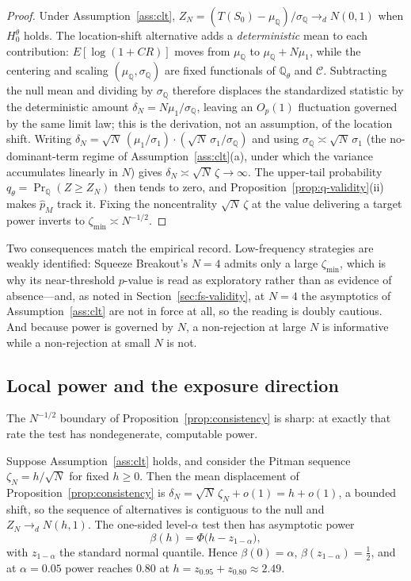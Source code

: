 \begin{proof}
Under Assumption~\ref{ass:clt}, $Z_N=(T(S_0)-\mu_{\mathbb Q})/\sigma_{\mathbb
Q}\to_d N(0,1)$ when $H_0^\theta$ holds. The location-shift alternative adds a
\emph{deterministic} mean to each contribution: $E[\log(1+CR)]$ moves from
$\mu_{\mathbb Q}$ to $\mu_{\mathbb Q}+N\mu_1$, while the centering and scaling
$(\mu_{\mathbb Q},\sigma_{\mathbb Q})$ are fixed functionals of $\mathbb{Q}_\theta$
and $\mathcal C$. Subtracting the null mean and dividing by $\sigma_{\mathbb Q}$
therefore displaces the standardized statistic by the deterministic amount
$\delta_N=N\mu_1/\sigma_{\mathbb Q}$, leaving an $O_p(1)$ fluctuation governed by
the same limit law; this is the derivation, not an assumption, of the location
shift. Writing $\delta_N=\sqrt N\,(\mu_1/\sigma_1)\cdot(\sqrt N\,\sigma_1/
\sigma_{\mathbb Q})$ and using $\sigma_{\mathbb Q}\asymp\sqrt N\,\sigma_1$
(the no-dominant-term regime of Assumption~\ref{ass:clt}(a), under which the
variance accumulates linearly in $N$) gives $\delta_N\asymp\sqrt N\,\zeta\to
\infty$. The upper-tail probability $q_\theta=\Pr_{\mathbb Q}(Z\ge Z_N)$ then
tends to zero, and Proposition~\ref{prop:q-validity}(ii) makes $\hat p_M$ track
it. Fixing the noncentrality $\sqrt N\,\zeta$ at the value delivering a target
power inverts to $\zeta_{\min}\asymp N^{-1/2}$.
\end{proof}

Two consequences match the empirical record. Low-frequency strategies are weakly
identified: Squeeze Breakout's $N=4$ admits only a large $\zeta_{\min}$, which is
why its near-threshold $p$-value is read as exploratory rather than as evidence of
absence---and, as noted in Section~\ref{sec:fs-validity}, at $N=4$ the
asymptotics of Assumption~\ref{ass:clt} are not in force at all, so the reading
is doubly cautious. And because power is governed by $N$, a non-rejection at
large $N$ is informative while a non-rejection at small $N$ is not.

\subsection{Local power and the exposure direction}
\label{sec:local-power}

The $N^{-1/2}$ boundary of Proposition~\ref{prop:consistency} is sharp: at exactly
that rate the test has nondegenerate, computable power.

\begin{proposition}
\label{prop:local-power}
Suppose Assumption~\ref{ass:clt} holds, and consider the Pitman sequence
$\zeta_N=h/\sqrt N$ for fixed $h\ge0$. Then the mean displacement of
Proposition~\ref{prop:consistency} is $\delta_N=\sqrt N\,\zeta_N+o(1)=h+o(1)$, a
bounded shift, so the sequence of alternatives is contiguous to the null and
$Z_N\to_d N(h,1)$. The one-sided level-$\alpha$ test then has asymptotic power
\[
\beta(h)=\Phi\big(h-z_{1-\alpha}\big),
\]
with $z_{1-\alpha}$ the standard normal quantile. Hence $\beta(0)=\alpha$,
$\beta(z_{1-\alpha})=\tfrac12$, and at $\alpha=0.05$ power reaches $0.80$ at
$h=z_{0.95}+z_{0.80}\approx2.49$.
\end{proposition}

